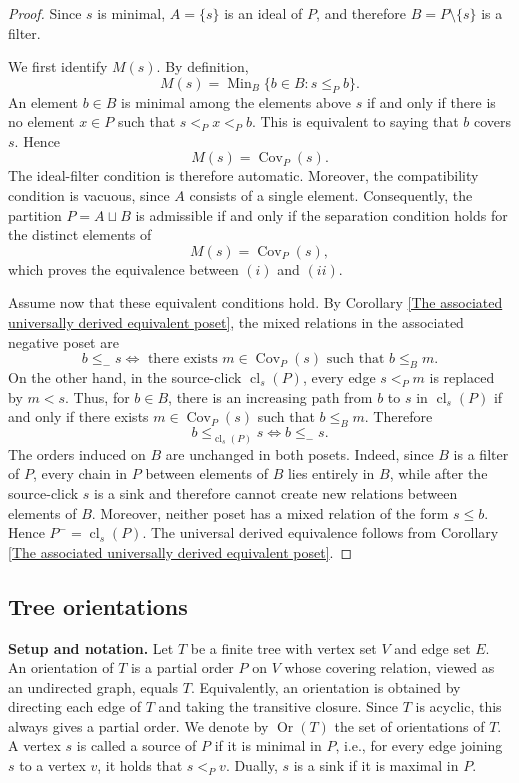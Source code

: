 \begin{proof}
   Since $s$ is minimal, $A=\{s\}$ is an ideal of $P$, and therefore $B=P \setminus\{s\}$ is a filter.

   We first identify $M(s)$. By definition, \[M(s)=\operatorname{Min}_B\{b \in B \colon s \leq_Pb\}.\] An element $b \in B$ is minimal among the elements above $s$ if and only if there is no element $x \in P$ such that $s<_Px<_Pb$. This is equivalent to saying that $b$ covers $s$. Hence \[M(s)= \operatorname{Cov}_P(s).\]
   The ideal-filter condition is therefore automatic. Moreover, the compatibility condition is vacuous, since $A$ consists of a single element. Consequently, the partition $P=A \sqcup B$ is admissible if and only if the separation condition holds for the distinct elements of \[M(s)=\operatorname{Cov}_P(s),\] which proves the equivalence between $(i)$ and $(ii)$. 

   Assume now that these equivalent conditions hold. By Corollary \ref{The associated universally derived equivalent poset}, the mixed relations in the associated negative poset are
   \[b\leq_-s \iff \text{ there exists } m \in \operatorname{Cov}_P(s) \text{ such that } b \leq_B m.\]
   On the other hand, in the source-click $\operatorname{cl}_s(P)$, every edge $s<_Pm$ is replaced by $m<s$. Thus, for $b \in B$, there is an increasing path from $b$ to $s$ in $\operatorname{cl}_s(P)$ if and only if there exists $m \in \operatorname{Cov}_P(s)$ such that $b \leq_Bm$. Therefore 
   \[b \leq_{\operatorname{cl}_s(P)}s \iff b \leq_-s.\] The orders induced on $B$ are unchanged in both posets. Indeed, since $B$ is a filter of $P$, every chain in $P$ between elements of $B$ lies entirely in $B$, while after the source-click $s$ is a sink and therefore cannot create new relations between elements of $B$. Moreover, neither poset has a mixed relation of the form $s \leq b$. Hence $P^-= \operatorname{cl}_s(P)$. The universal derived equivalence follows from Corollary \ref{The associated universally derived equivalent poset}.

   
\end{proof}

\subsection{Tree orientations}

\textbf{Setup and notation.} Let $T$ be a finite tree with vertex set $V$ and edge set $E$. An orientation of $T$ is a partial order $P$ on $V$ whose covering relation, viewed as an undirected graph, equals $T$. Equivalently, an orientation is obtained by directing each edge of $T$ and taking the transitive closure. Since $T$ is acyclic, this always gives a partial order. We denote by $\operatorname{Or}(T)$ the set of orientations of $T$. A vertex $s$ is called a source of $P$ if it is minimal in $P$, i.e., for every edge joining $s$ to a vertex $v$, it holds that $s <_Pv$. Dually, $s$ is a sink if it is maximal in $P$. 

